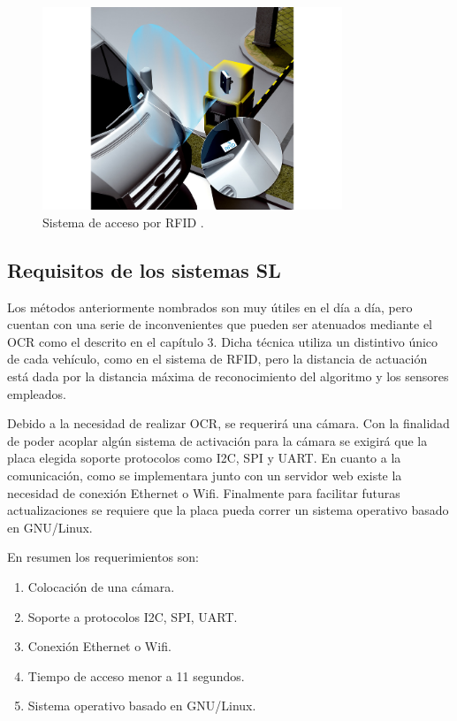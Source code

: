 \begin{figure}[bth]
    \centering
    \includegraphics[width=0.8\textwidth]{imgs/sistema-control-acceso-barreras-rfid.jpg}
    \caption{Sistema de acceso por RFID \cite{noauthor_acceso_nodate}.}
    \label{fig:sistema-moderno}
\end{figure}

\subsection{Requisitos de los sistemas SL}

Los métodos anteriormente nombrados son muy útiles en el día a día, pero cuentan con una serie de inconvenientes que pueden ser atenuados mediante el OCR como el descrito en el capítulo 3.
Dicha técnica utiliza un distintivo único de cada vehículo, como en el sistema de RFID, pero la distancia de actuación está dada por la distancia máxima de reconocimiento del algoritmo y los sensores empleados.

Debido a la necesidad de realizar OCR, se requerirá una cámara. Con la finalidad de poder acoplar algún sistema de activación para la cámara se exigirá que la placa elegida soporte protocolos como I2C, SPI y UART. En cuanto a la comunicación, como se implementara junto con un servidor web existe la necesidad de conexión Ethernet o Wifi. Finalmente para facilitar futuras actualizaciones se requiere que la placa pueda correr un sistema operativo basado en GNU/Linux.

En resumen los requerimientos son:

\begin{enumerate}
    \item Colocación de una cámara.
    \item Soporte a protocolos I2C, SPI, UART.
    \item Conexión Ethernet o Wifi.
    \item Tiempo de acceso menor a 11 segundos.
    \item Sistema operativo basado en GNU/Linux.
\end{enumerate}


